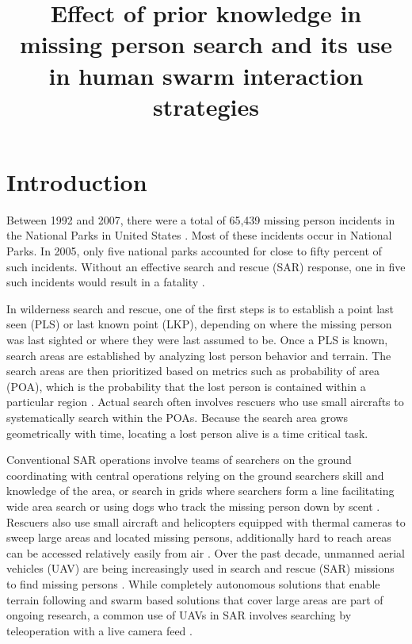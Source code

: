 \documentclass{article}
\title{Effect of prior knowledge in missing person search and its use in human swarm interaction strategies}
\begin{document}
\maketitle

\section{Introduction}
 Between 1992 and 2007, there were a total of 65,439 missing person incidents in the National Parks in United States \cite{heggie2009dead}. Most of these incidents occur in National Parks.  In 2005, only five national parks accounted for close to fifty percent of such incidents. Without an effective search and rescue (SAR) response, one in five such incidents would result in a fatality \cite{heggie2009dead}. 

In wilderness search and rescue, one of the first steps is to establish a point last seen (PLS) or last known point (LKP), depending on where the missing person was last sighted or where they were last assumed to be. Once a PLS is known, search areas are established by analyzing lost person behavior and terrain. The search areas are then prioritized based on metrics such as probability of area (POA), which is the probability that the lost person is contained within a particular region \cite{doherty2014analysis}. Actual search often involves rescuers who use small aircrafts to systematically search within the POAs. Because the search area grows geometrically with time, locating a lost person alive is a time critical task. 

Conventional SAR operations involve teams of searchers on the ground coordinating with central operations relying on the ground searchers skill and knowledge of the area, or search in grids where searchers form a line facilitating wide area search or using dogs who track the missing person down by scent \cite{dickSAR}. Rescuers also use small aircraft and helicopters equipped with thermal cameras to sweep large areas and located missing persons, additionally hard to reach areas can be accessed relatively easily from air \cite{dickSAR}. Over the past decade, unmanned aerial vehicles (UAV) are being increasingly used in search and rescue (SAR) missions to find missing persons \cite{tusnio2021efficiency,goodrich2008supporting,grogan2018use}. While completely autonomous solutions that enable terrain following \cite{silvagni2017multipurpose} and swarm based solutions that cover large areas \cite{nunnally2012human} are part of ongoing research, a common use of UAVs in SAR involves searching by teleoperation with a live camera feed \cite{delmerico2019current, isaacs2022teleoperation}. %
\end{document}
